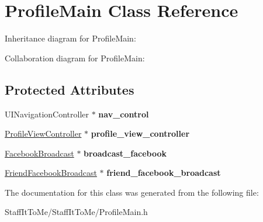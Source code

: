 \hypertarget{interface_profile_main}{
\section{\-Profile\-Main \-Class \-Reference}
\label{interface_profile_main}
}


\-Inheritance diagram for \-Profile\-Main\-:


\-Collaboration diagram for \-Profile\-Main\-:
\subsection*{\-Protected \-Attributes}
\begin{DoxyCompactItemize}
\item 
\hypertarget{interface_profile_main_aa119400d03e993627e4886d9d2e9dbd9}{
\-U\-I\-Navigation\-Controller $\ast$ {\bfseries nav\-\_\-control}}
\label{interface_profile_main_aa119400d03e993627e4886d9d2e9dbd9}

\item 
\hypertarget{interface_profile_main_af4615027518ddeb5cee9453f621d73d2}{
\hyperlink{interface_profile_view_controller}{\-Profile\-View\-Controller} $\ast$ {\bfseries profile\-\_\-view\-\_\-controller}}
\label{interface_profile_main_af4615027518ddeb5cee9453f621d73d2}

\item 
\hypertarget{interface_profile_main_abf476d5f9f302efb14eff9669aefe29e}{
\hyperlink{interface_facebook_broadcast}{\-Facebook\-Broadcast} $\ast$ {\bfseries broadcast\-\_\-facebook}}
\label{interface_profile_main_abf476d5f9f302efb14eff9669aefe29e}

\item 
\hypertarget{interface_profile_main_abcd58a91ff8e06ac4e01f40e95e02d5a}{
\hyperlink{interface_friend_facebook_broadcast}{\-Friend\-Facebook\-Broadcast} $\ast$ {\bfseries friend\-\_\-facebook\-\_\-broadcast}}
\label{interface_profile_main_abcd58a91ff8e06ac4e01f40e95e02d5a}

\end{DoxyCompactItemize}


\-The documentation for this class was generated from the following file\-:\begin{DoxyCompactItemize}
\item 
\-Staff\-It\-To\-Me/\-Staff\-It\-To\-Me/\-Profile\-Main.\-h\end{DoxyCompactItemize}
